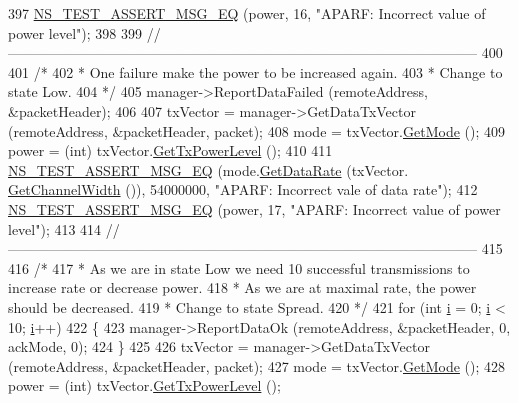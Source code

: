 \begin{DoxyCode}
397   \hyperlink{group__testing_ga2a9d78cffb3db8e867c35fff0b698cf5}{NS\_TEST\_ASSERT\_MSG\_EQ} (power, 16, \textcolor{stringliteral}{"APARF: Incorrect value of power level"});
398 
399   \textcolor{comment}{//-----------------------------------------------------------------------------------------------------}
400 
401   \textcolor{comment}{/*}
402 \textcolor{comment}{   * One failure make the power to be increased again.}
403 \textcolor{comment}{   * Change to state Low.}
404 \textcolor{comment}{   */}
405   manager->ReportDataFailed (remoteAddress, &packetHeader);
406 
407   txVector = manager->GetDataTxVector (remoteAddress, &packetHeader, packet);
408   mode = txVector.\hyperlink{classns3_1_1WifiTxVector_a497b1f11cad4b8b26251dfa07c9ad1d6}{GetMode} ();
409   power = (int) txVector.\hyperlink{classns3_1_1WifiTxVector_a7c98bd9609ff1c5cefa6e22d6908a2fe}{GetTxPowerLevel} ();
410 
411   \hyperlink{group__testing_ga2a9d78cffb3db8e867c35fff0b698cf5}{NS\_TEST\_ASSERT\_MSG\_EQ} (mode.\hyperlink{classns3_1_1WifiMode_adcfbe150f69da720db23387f733b8a52}{GetDataRate} (txVector.
      \hyperlink{classns3_1_1WifiTxVector_a1f8bfa51778a3e217581eb665f059564}{GetChannelWidth} ()), 54000000, \textcolor{stringliteral}{"APARF: Incorrect vale of data rate"});
412   \hyperlink{group__testing_ga2a9d78cffb3db8e867c35fff0b698cf5}{NS\_TEST\_ASSERT\_MSG\_EQ} (power, 17, \textcolor{stringliteral}{"APARF: Incorrect value of power level"});
413 
414   \textcolor{comment}{//-----------------------------------------------------------------------------------------------------}
415 
416   \textcolor{comment}{/*}
417 \textcolor{comment}{   * As we are in state Low we need 10 successful transmissions to increase rate or decrease power.}
418 \textcolor{comment}{   * As we are at maximal rate, the power should be decreased.}
419 \textcolor{comment}{   * Change to state Spread.}
420 \textcolor{comment}{   */}
421   \textcolor{keywordflow}{for} (\textcolor{keywordtype}{int} \hyperlink{bernuolliDistribution_8m_a6f6ccfcf58b31cb6412107d9d5281426}{i} = 0; \hyperlink{bernuolliDistribution_8m_a6f6ccfcf58b31cb6412107d9d5281426}{i} < 10; \hyperlink{bernuolliDistribution_8m_a6f6ccfcf58b31cb6412107d9d5281426}{i}++)
422     \{
423       manager->ReportDataOk (remoteAddress, &packetHeader, 0, ackMode, 0);
424     \}
425 
426   txVector = manager->GetDataTxVector (remoteAddress, &packetHeader, packet);
427   mode = txVector.\hyperlink{classns3_1_1WifiTxVector_a497b1f11cad4b8b26251dfa07c9ad1d6}{GetMode} ();
428   power = (int) txVector.\hyperlink{classns3_1_1WifiTxVector_a7c98bd9609ff1c5cefa6e22d6908a2fe}{GetTxPowerLevel} ();

\end{DoxyCode}
